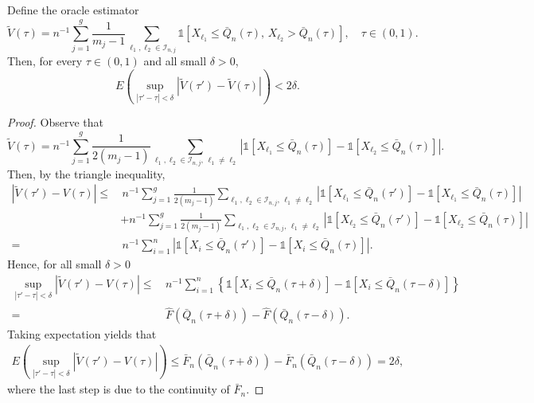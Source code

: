 \documentclass[10pt,a4paper]{amsart}
\begin{document}
\begin{lemma}\label{lem:tight}
	Define the oracle estimator
	\begin{equation*}
		\widetilde{V}(\tau)=n^{-1}\sum_{j=1}^{g}\frac{1}{m_j-1}\sum_{\ell_1,\ell_2\in \mathcal{I}_{n,j}}\mathds{1}\left[ X_{\ell_1}\leq \bar{Q}_{n}(\tau),\,
		X_{\ell_2}>\bar{Q}_{n}(\tau)\right],\quad \tau\in (0,1).
	\end{equation*}
	Then, for every $\tau\in (0,1)$ and all small $\delta>0$,
	\begin{equation*}
		E\left( \sup_{|\tau'-\tau|<\delta}\left|\widetilde{V}(\tau')-\widetilde{V}(\tau) \right|\right)   <2\delta.
	\end{equation*}
\end{lemma}

\begin{proof}
	Observe that
	\begin{equation*}
		\widetilde{V}(\tau)=n^{-1}\sum_{j=1}^{g}\frac{1}{2(m_j-1)}\sum_{\ell_1,\ell_2\in \mathcal{I}_{n,j},\, \ell_1 \neq \ell_2}\left| \mathds{1}\left[ X_{\ell_1}\leq \bar{Q}_{n}(\tau)\right] 
		-\mathds{1}\left[ X_{\ell_2}\leq \bar{Q}_{n}(\tau)\right]\right| .
	\end{equation*}
	Then, by the triangle inequality,
	\begin{align*}
		\left| \widetilde{V}(\tau')-V(\tau)\right|
		\leq&\, n^{-1}\sum_{j=1}^{g}\frac{1}{2(m_j-1)}\sum_{\ell_1,\ell_2\in \mathcal{I}_{n,j},\, \ell_1 \neq \ell_2 }
		\left| \mathds{1}\left[ X_{\ell_1}\leq \bar{Q}_{n}(\tau')\right] 
		-\mathds{1}\left[ X_{\ell_1}\leq \bar{Q}_{n}(\tau)\right] \right|\\
		&+n^{-1}\sum_{j=1}^{g}\frac{1}{2(m_j-1)}\sum_{\ell_1,\ell_2\in \mathcal{I}_{n,j}, \, \ell_1 \neq \ell_2}
		\left| \mathds{1}\left[ X_{\ell_2}\leq \bar{Q}_{n}(\tau')\right] 
		-\mathds{1}\left[ X_{\ell_2}\leq \bar{Q}_{n}(\tau)\right] \right|\\
		=&\, n^{-1}\sum_{i=1}^{n}
		\left| \mathds{1}\left[ X_{i}\leq \bar{Q}_{n}(\tau')\right] 
		-\mathds{1}\left[ X_{i}\leq \bar{Q}_{n}(\tau)\right] \right|.
	\end{align*}
	Hence, for all small $\delta>0$
	\begin{align*}
		\sup_{|\tau'-\tau|<\delta}\left| \widetilde{V}(\tau')-V(\tau)\right|
		\leq&\, n^{-1}\sum_{i=1}^{n}\left\lbrace \mathds{1}\left[ X_{i}\leq \bar{Q}_{n}(\tau+\delta)\right]
		-\mathds{1}\left[ X_{i}\leq \bar{Q}_{n}(\tau-\delta)\right]\right\rbrace\\
		=&\, \widehat{F}\left(\bar{Q}_{n}(\tau+\delta) \right)-\widehat{F}\left(\bar{Q}_{n}(\tau-\delta) \right).
	\end{align*}
	Taking expectation yields that
	\begin{align*}
		E\left( \sup_{|\tau'-\tau|<\delta}\left| \widetilde{V}(\tau')-V(\tau)\right|\right) 
		\leq \bar{F}_n\left(\bar{Q}_{n}(\tau+\delta) \right)-\bar{F}_n\left(\bar{Q}_{n}(\tau-\delta) \right)
		=2\delta,
	\end{align*}
	where the last step is due to the continuity of $\bar{F}_n$.
\end{proof}
\end{document}
